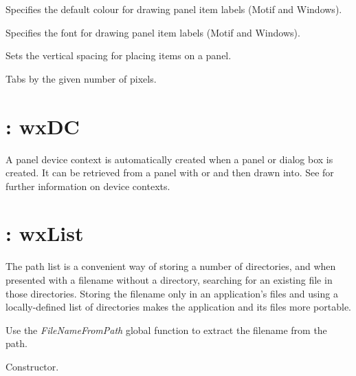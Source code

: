 

Specifies the default colour for drawing panel item labels (Motif and Windows).



Specifies the font for drawing panel item labels (Motif and Windows).



Sets the vertical spacing for placing items on a panel.



Tabs by the given number of pixels.

\section{: wxDC}\label{wxpaneldc}

A panel device context is automatically created when a panel or dialog box is created.
It can be retrieved from a panel with  or
 and then
drawn into. See  for further information on device contexts.

\section{: wxList}\label{wxpathlist}

The path list is a convenient way of storing a number of directories, and
when presented with a filename without a directory, searching for an existing file
in those directories.  Storing the filename only in an application's files and
using a locally-defined list of directories makes the application and its files more
portable.

Use the {\it FileNameFromPath} global function to extract the filename
from the path.



Constructor.

